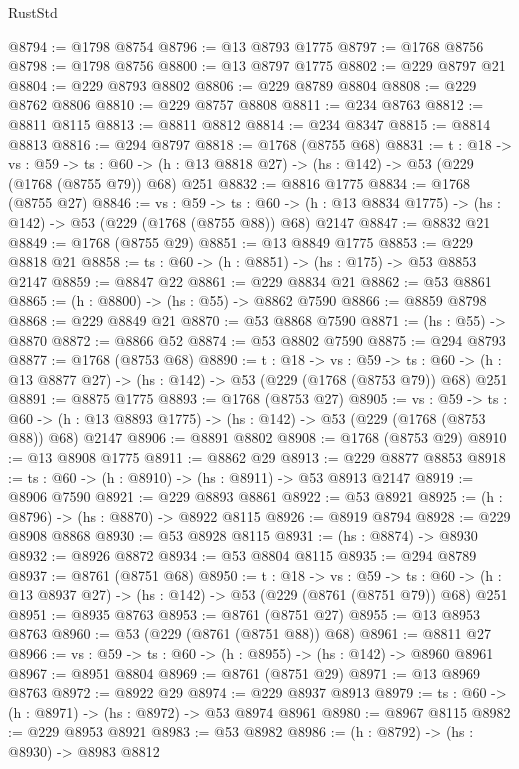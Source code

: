 \begin{lexlean}{RustStd}
\begin{coremodule}
@8794 := @1798 @8754
@8796 := @13 @8793 @1775
@8797 := @1768 @8756
@8798 := @1798 @8756
@8800 := @13 @8797 @1775
@8802 := @229 @8797 @21
@8804 := @229 @8793 @8802
@8806 := @229 @8789 @8804
@8808 := @229 @8762 @8806
@8810 := @229 @8757 @8808
@8811 := @234 @8763
@8812 := @8811 @8115
@8813 := @8811 @8812
@8814 := @234 @8347
@8815 := @8814 @8813
@8816 := @294 @8797
@8818 := @1768 (@8755 @68)
@8831 := {t : @18} ->
  {vs : @59} ->
  {ts : @60} -> (h : @13 @8818 @27) -> (hs : @142) -> @53 (@229 (@1768 (@8755 @79)) @68) @251
@8832 := @8816 @1775
@8834 := @1768 (@8755 @27)
@8846 := {vs : @59} ->
  {ts : @60} -> (h : @13 @8834 @1775) -> (hs : @142) -> @53 (@229 (@1768 (@8755 @88)) @68) @2147
@8847 := @8832 @21
@8849 := @1768 (@8755 @29)
@8851 := @13 @8849 @1775
@8853 := @229 @8818 @21
@8858 := {ts : @60} -> (h : @8851) -> (hs : @175) -> @53 @8853 @2147
@8859 := @8847 @22
@8861 := @229 @8834 @21
@8862 := @53 @8861
@8865 := (h : @8800) -> (hs : @55) -> @8862 @7590
@8866 := @8859 @8798
@8868 := @229 @8849 @21
@8870 := @53 @8868 @7590
@8871 := (hs : @55) -> @8870
@8872 := @8866 @52
@8874 := @53 @8802 @7590
@8875 := @294 @8793
@8877 := @1768 (@8753 @68)
@8890 := {t : @18} ->
  {vs : @59} ->
  {ts : @60} -> (h : @13 @8877 @27) -> (hs : @142) -> @53 (@229 (@1768 (@8753 @79)) @68) @251
@8891 := @8875 @1775
@8893 := @1768 (@8753 @27)
@8905 := {vs : @59} ->
  {ts : @60} -> (h : @13 @8893 @1775) -> (hs : @142) -> @53 (@229 (@1768 (@8753 @88)) @68) @2147
@8906 := @8891 @8802
@8908 := @1768 (@8753 @29)
@8910 := @13 @8908 @1775
@8911 := @8862 @29
@8913 := @229 @8877 @8853
@8918 := {ts : @60} -> (h : @8910) -> (hs : @8911) -> @53 @8913 @2147
@8919 := @8906 @7590
@8921 := @229 @8893 @8861
@8922 := @53 @8921
@8925 := (h : @8796) -> (hs : @8870) -> @8922 @8115
@8926 := @8919 @8794
@8928 := @229 @8908 @8868
@8930 := @53 @8928 @8115
@8931 := (hs : @8874) -> @8930
@8932 := @8926 @8872
@8934 := @53 @8804 @8115
@8935 := @294 @8789
@8937 := @8761 (@8751 @68)
@8950 := {t : @18} ->
  {vs : @59} ->
  {ts : @60} -> (h : @13 @8937 @27) -> (hs : @142) -> @53 (@229 (@8761 (@8751 @79)) @68) @251
@8951 := @8935 @8763
@8953 := @8761 (@8751 @27)
@8955 := @13 @8953 @8763
@8960 := @53 (@229 (@8761 (@8751 @88)) @68)
@8961 := @8811 @27
@8966 := {vs : @59} -> {ts : @60} -> (h : @8955) -> (hs : @142) -> @8960 @8961
@8967 := @8951 @8804
@8969 := @8761 (@8751 @29)
@8971 := @13 @8969 @8763
@8972 := @8922 @29
@8974 := @229 @8937 @8913
@8979 := {ts : @60} -> (h : @8971) -> (hs : @8972) -> @53 @8974 @8961
@8980 := @8967 @8115
@8982 := @229 @8953 @8921
@8983 := @53 @8982
@8986 := (h : @8792) -> (hs : @8930) -> @8983 @8812

\end{coremodule}
\end{lexlean}
